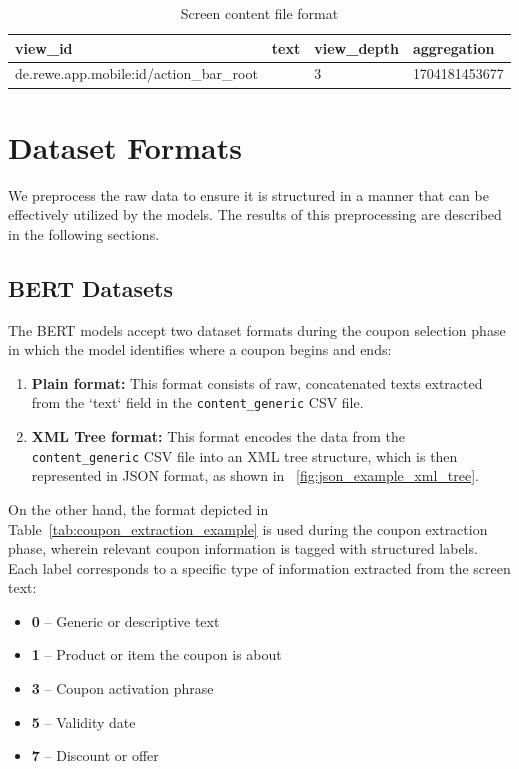 \documentclass[licencjacka,en]{pracamgr}
\begin{document}
\begin{table}[ht]
\centering
\begin{tabular}{|l|l|l|l|}
\hline
\textbf{view\_id} & \textbf{text} & \textbf{view\_depth} & \textbf{aggregation} \\
\hline
de.rewe.app.mobile:id/action\_bar\_root &  & 3 & 1704181453677 \\
\hline
\end{tabular}
\caption{Screen content file format}
\label{tab:coupons_rev_2_content}
\end{table}

\section{Dataset Formats}
We preprocess the raw data to ensure it is structured in a manner that can be effectively utilized by the models. The results of this preprocessing are described in the following sections.

\subsection{BERT Datasets}
The BERT models accept two dataset formats during the coupon selection phase in which the model identifies where a coupon begins and ends:

\begin{enumerate}
    \item \textbf{Plain format:} This format consists of raw, concatenated texts extracted from the `text` field in the \texttt{content\_generic} CSV file.
    \item \textbf{XML Tree format:} This format encodes the data from the \texttt{content\_generic} CSV file into an XML tree structure, which is then represented in JSON format, as shown in ~\ref{fig:json_example_xml_tree}.
\end{enumerate}

On the other hand, the format depicted in Table~\ref{tab:coupon_extraction_example} is used during the coupon extraction phase, wherein relevant coupon information is tagged with structured labels. Each label corresponds to a specific type of information extracted from the screen text:

\begin{itemize}
    \item \textbf{0} – Generic or descriptive text
    \item \textbf{1} – Product or item the coupon is about
    \item \textbf{3} – Coupon activation phrase
    \item \textbf{5} – Validity date
    \item \textbf{7} – Discount or offer
\end{itemize}
\end{document}
